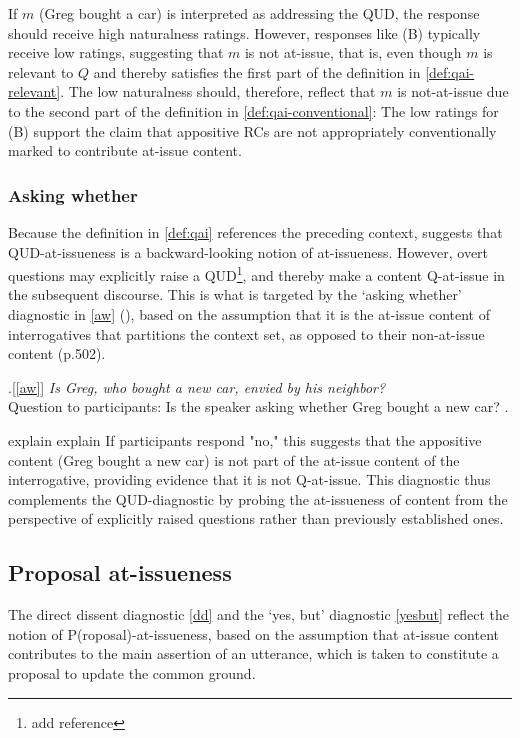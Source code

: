 \documentclass[times,linguex,xcolor]{glossa}
\begin{document}
    If $m$ (Greg bought a car) is interpreted as addressing the QUD, the response should receive high naturalness ratings. However, responses like (B) typically receive low ratings, suggesting that $m$ is not at-issue, that is, even though $m$ is relevant to $Q$ and thereby satisfies the first part of the definition in \ref{def:qai-relevant}. The low naturalness should, therefore, reflect that $m$ is not-at-issue due to the second part of the definition in \ref{def:qai-conventional}: The low ratings for (B) support the claim that appositive RCs are not appropriately conventionally marked to contribute at-issue content.
    

    \subsubsection{Asking whether}
    Because the definition in \ref{def:qai} references the preceding context, \citet{koev_notions_2018} suggests that QUD-at-issueness is a backward-looking notion of at-issueness. However, overt questions may explicitly raise a QUD\footnote{add reference}, and thereby make a content Q-at-issue in the subsequent discourse. This is what is targeted by the `asking whether' diagnostic in \ref{aw} (\citealt{tonhauser_how_2018}), based on the assumption that it is the at-issue content of interrogatives that partitions the context set, as opposed to their non-at-issue content (p.502).

    \ex.[\ref{aw}]%
        \emph{Is Greg, who bought a new car, envied by his neighbor?}\smallskip
    \\ Question to participants: Is the speaker asking whether Greg bought a new car?
    \z.

    explain explain
    If participants respond "no," this suggests that the appositive content (Greg bought a new car) is not part of the at-issue content of the interrogative, providing evidence that it is not Q-at-issue. This diagnostic thus complements the QUD-diagnostic by probing the at-issueness of content from the perspective of explicitly raised questions rather than previously established ones.

  \subsection{Proposal at-issueness}
    The direct dissent diagnostic \ref{dd} and the `yes, but' diagnostic \ref{yesbut} reflect the notion of P(roposal)-at-issueness, based on the assumption that at-issue content contributes to the main assertion of an utterance, which is taken to constitute a proposal to update the common ground.
\end{document}
